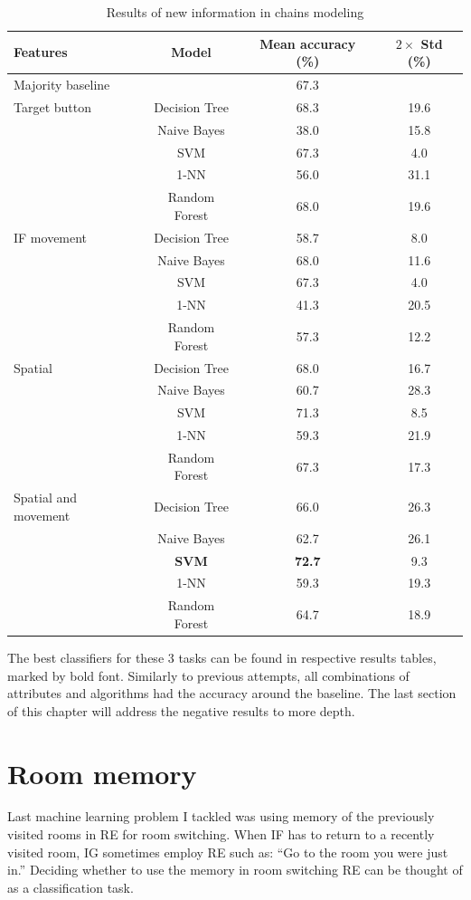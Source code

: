 \begin{table}[!htbp]
 \centering
\begin{tabular}{lccc}
\toprule
Features & Model    & Mean accuracy (\%) &  $2\times$ Std (\%) \\
\midrule
 Majority baseline  &   & 67.3	& \\
\midrule
Target button 	& Decision Tree 	& 68.3	& 19.6 	\\
				& Naive Bayes  	& 38.0	& 15.8	\\
				& SVM 			& 67.3	& 4.0 	\\
				& 1-NN			& 56.0	& 31.1 	\\
				& Random Forest	& 68.0	& 19.6	\\
\midrule
IF movement	& Decision Tree 	& 	58.7	& 8.0 \\
			& Naive Bayes  	&	68.0	& 11.6	\\
			& SVM 			&	67.3	& 4.0 	\\
			& 1-NN			&	41.3	& 20.5 	\\
			& Random Forest	&	57.3& 12.2 	\\
			
\midrule
Spatial	 	& Decision Tree 	& 68.0	& 16.7 \\
			& Naive Bayes  	& 60.7 	& 28.3	\\
			& SVM 			& 71.3	& 8.5 	\\
			& 1-NN			& 59.3	& 21.9 \\
			& Random Forest	& 67.3	& 17.3 \\	

\midrule
Spatial and movement& Decision Tree 	& 66.0	& 26.3 \\
					& Naive Bayes  	& 62.7	& 26.1	\\
					& \textbf{SVM} 	& \textbf{72.7}	& 9.3 	\\
					& 1-NN			& 59.3	& 19.3 \\
					& Random Forest	& 64.7	& 18.9 \\	 	
\bottomrule
\end{tabular}
\caption{Results of new information in chains modeling}
\label{tab:chains-ml-infgain}
\end{table}

The best classifiers for these 3 tasks can be found in respective results tables, marked by bold font. Similarly to previous attempts, all combinations of attributes and algorithms had the accuracy around the baseline. The last section of this chapter will address the negative results to more depth.

\section{Room memory}
Last machine learning problem I tackled was using memory of the previously visited rooms in RE for room switching. When IF has to return to a recently visited room, IG sometimes employ RE such as: ``Go to the room you were just in.'' Deciding whether to use the memory in room switching RE can be thought of as a classification task.

